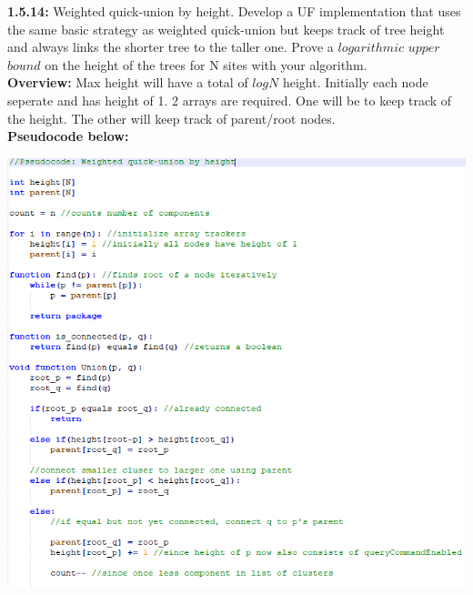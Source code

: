 \documentclass[11pt,fleqn]{article}
\begin{document}
\textbf{1.5.14:} Weighted quick-union by height. Develop a UF implementation that uses the
same basic strategy as weighted quick-union but keeps track of tree height and always
links the shorter tree to the taller one. Prove a $logarithmic$ $upper$ $bound$ on the height
of the trees for N sites with your algorithm.\\

\textbf{Overview:} Max height will have a total of $logN$ height. Initially each node seperate and has height of 1. 2 arrays are required. One will be to keep track of the height. The other will keep track of parent/root nodes.\\

\textbf{Pseudocode below:}\\

\begin{center}
	\includegraphics[scale = 1]{1.5.14.png}
	\end{center}
\end{document}
